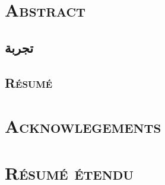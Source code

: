 \documentclass[12pt, twoside]{book}
\begin{document}
    \dominitoc
    \doparttoc
    \frontmatter
    \pagestyle{plain}
   
    
    
    \chapter{\textsc{Abstract}}
        
    \begin{arabic}
        \chapter{تجربة}
            
    \end{arabic}
    \begin{french}
        \chapter{\textsc{Résumé}}
        
    \end{french}

    \chapter{\textsc{Acknowlegements}}
        

    \chapter{\textsc{Résumé étendu}}
        

    \printglossary[type=\acronymtype]
    \printglossary

    \mtcaddchapter
    \tableofcontents
    \mtcaddchapter
    \listoffigures
    \mtcaddchapter
    \listoftables
    \mtcaddchapter

    \mainmatter

    
\end{document}
